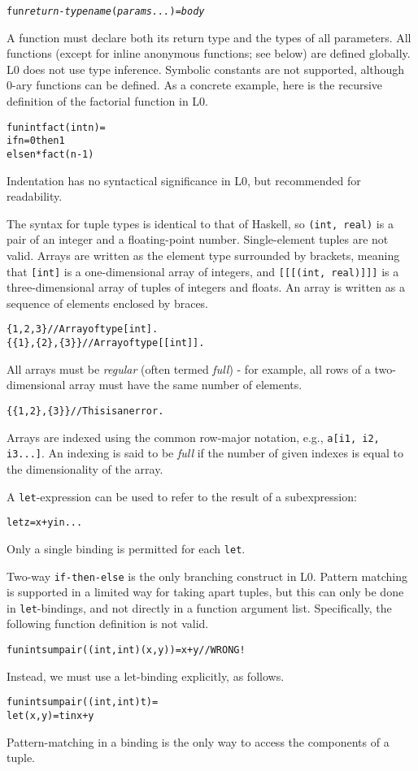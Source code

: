 \documentclass[oneside]{memoir}
\begin{document}
\begin{alltt}
  fun \textit{return-type} \textit{name}(\textit{params...}) = \textit{body}
\end{alltt}

A function must declare both its return type and the types of all
parameters.  All functions (except for inline anonymous functions; see
below) are defined globally.  L0 does not use type inference.
Symbolic constants are not supported, although 0-ary functions can be
defined.  As a concrete example, here is the recursive definition of
the factorial function in L0.
\begin{alltt}
  fun int fact(int n) =
    if n = 0 then 1
             else n * fact(n-1)
\end{alltt}
Indentation has no syntactical significance in L0, but recommended for
readability.

The syntax for tuple types is identical to that of Haskell, so
\texttt{(int, real)} is a pair of an integer and a floating-point
number.  Single-element tuples are not valid.  Arrays are written as
the element type surrounded by brackets, meaning that \texttt{[int]}
is a one-dimensional array of integers, and \texttt{[[[(int, real)]]]}
is a three-dimensional array of tuples of integers and floats.  An
array is written as a sequence of elements enclosed by braces.
\begin{alltt}
  \{1, 2, 3\}       // Array of type [int].
  \{\{1\}, \{2\}, \{3\}\} // Array of type [[int]].
\end{alltt}
All arrays must be \emph{regular} (often termed \emph{full}) - for
example, all rows of a two-dimensional array must have the same number
of elements.
\begin{alltt}
  \{\{1, 2\}, \{3\}\} // This is an error.
\end{alltt}
Arrays are indexed using the common row-major notation, 
e.g., \texttt{a[i1, i2, i3...]}.  An indexing is said to be \textit{full} if
the number of given indexes is equal to the dimensionality of the
array.

A \texttt{let}-expression can be used to refer to the result of a
subexpression:
\begin{alltt}
  let z = x + y in ...
\end{alltt}
Only a single binding is permitted for each \texttt{let}.

Two-way \texttt{if-then-else} is the only branching construct in L0.
Pattern matching is supported in a limited way for taking apart
tuples, but this can only be done in \texttt{let}-bindings, and not
directly in a function argument list.  Specifically, the following
function definition is not valid.
\begin{alltt}
  fun int sumpair((int, int) (x, y)) = x + y // WRONG!
\end{alltt}
Instead, we must use a let-binding explicitly, as follows.
\begin{alltt}
  fun int sumpair((int, int) t) =
    let (x,y) = t in x + y
\end{alltt}
Pattern-matching in a binding is the only way to access the components
of a tuple.
\end{document}
